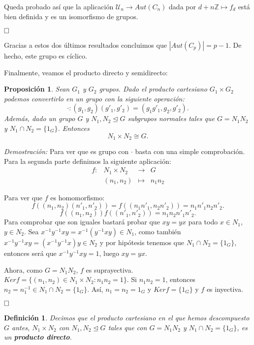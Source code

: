 \documentclass[12pt]{article}
\newtheorem{proposition}[theorem]{Proposición}
\newtheorem{definition}[theorem]{Definición}
\begin{document}
Queda probado así que la aplicación $\mathcal{U}_n \longrightarrow Aut(C_n)$ dada por $d+n\mathbb{Z} \longmapsto f_d$ está bien definida y es un isomorfismo de grupos.

$\hfill \square$

Gracias a estos dos últimos resultados concluimos que $|Aut(C_p)| = p-1$. De hecho, este grupo es cíclico.

Finalmente, veamos el producto directo y semidirecto:

\begin{proposition}Sean $G_{1}$ y $G_{2}$ grupos. Dado el producto cartesiano $G_{1} \times G_{2}$ podemos convertirlo en un grupo con la siguiente operación: $$\cdot \colon (g_{1},g_{2})(g'_{1},g'_{2})=(g_{1}g'_{1},g_{2},g'_{2}).$$
Además, dado un grupo $G$ y $N_{1},N_{2} \unlhd G$ subgrupos normales tales que $G=N_{1}N_{2}$ y $N_{1}\cap N_{2}=\lbrace 1_{G} \rbrace$. Entonces $$N_{1} \times N_{2} \cong G.$$
\end{proposition}
\emph{Demostración: }Para ver que es grupo con $\cdot$ basta con una simple comprobación. Para la segunda parte definimos la siguiente aplicación: 
$$\begin{array}{rccl}
f\colon &N_{1}\times N_{2} & \longrightarrow & G\\
&(n_{1},n_{2})& \longmapsto &n_{1}n_{2}
\end{array}
$$ 

Para ver que $f$ es homomorfismo: $$f((n_{1},n_{2})(n'_{1},n'_{2}))=f((n_{1}n'_{1},n_{2}n'_{2}))=n_{1}n'_{1}n_{2}n'_{2}.$$
$$f((n_{1},n_{2}))f((n'_{1},n'_{2}))=n_{1}n_{2}n'_{1}n'_{2}.$$
Para comprobar que son iguales bastará probar que $xy=yx$ para todo $x\in N_{1}$, $y\in N_{2}$. Sea $x^{-1}y^{-1}xy=x^{-1}(y^{-1}xy)\in N_{1}$, como también $x^{-1}y^{-1}xy=(x^{-1}y^{-1}x)y \in N_{2}$ y por hipótesis tenemos que $N_{1}\cap N_{2} = \lbrace 1_{G}\rbrace$, entonces será que $x^{-1}y^{-1}xy=1$, luego $xy=yx$. 

Ahora, como $G=N_{1}N_{2}$, $f$ es suprayectiva. $Ker f = \lbrace (n_{1},n_{2}) \in N_{1}\times N_{2}:n_{1}n_{2}=1 \rbrace$. Si $n_{1}n_{2}=1$, entonces $n_{2}=n_{1}^{-1}\in N_{1}\cap N_{2}=\lbrace 1_{G}\rbrace$. Así, $n_{1}=n_{2}=1_{G}$ y $Ker f=\lbrace 1_{G} \rbrace$ y $f$ es inyectiva.

$\hfill \square$

\begin{definition}Decimos que el producto cartesiano en el que hemos descompuesto $G$ antes, $N_{1}\times N_{2}$ con $N_{1}, N_{2}\unlhd G$ tales que con $G=N_{1}N_{2}$ y $N_{1}\cap N_{2}= \lbrace 1_{G} \rbrace$, es un \textbf{producto directo}. 
\end{definition}
\end{document}
